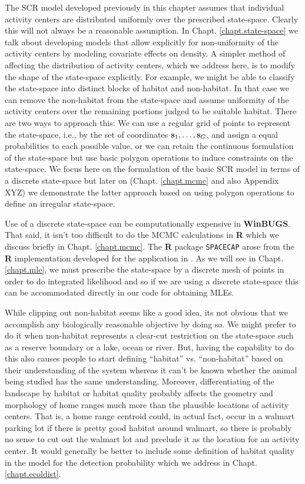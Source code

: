 {The SCR model developed previously in this chapter assumes that
individual activity centers are distributed uniformly over the
prescribed state-space. Clearly this will not always be a reasonable
assumption. In Chapt. \ref{chapt.state-space} we talk about developing models
that allow explicitly for non-uniformity of the activity centers by
modeling covariate effects on density. A simpler method of affecting
the distribution of activity centers, which we address here, is to
modify the shape of the state-space explicitly. For example, we might
be able to classify the state-space into distinct blocks of habitat
and non-habitat. In that case we can remove the non-habitat from the
state-space and assume uniformity of the activity centers over the
remaining portions judged to be suitable habitat.  There are two ways
to approach this: We can use a regular grid of points to represent the
state-space, i.e., by the set of coordinates ${\bf s}_1, \ldots, {\bf
  s}_{G}$, and assign a equal probabilities to each possible value, or
we can retain the continuous formulation of the state-space but use
basic polygon operations to induce constraints on the state-space. We
focus here on the formulation of the basic SCR model in terms of a
discrete state-space but later on (Chapt. \ref{chapt.mcmc} and also
Appendix XYZ) we demonstrate the latter approach based on using
polygon operations to define an irregular state-space.

Use of a discrete state-space can be computationally expensive in {\bf
  WinBUGS}. That said, it isn't too difficult to do the MCMC
calculations in {\bf R} which we discuss briefly in Chapt.
\ref{chapt.mcmc}. The {\bf R} package {\tt SPACECAP}
\citep{gopalaswamy_etal:2011} arose from the {\bf R} implementation
developed for the application in \citet{royle_etal:2009}.  As we will
see in Chapt. \ref{chapt.mle}, we must prescribe the state-space by a
discrete mesh of points in order to do integrated likelihood and so if
we are using a discrete state-space this can be accommodated directly
in our code for obtaining MLEs.

While clipping out non-habitat seems like a good idea, its not obvious
that we accomplish any biologically reasonable objective by doing
so. We might prefer to do it when non-habitat represents a clear-cut
restriction on the state-space such as a reserve boundary or a lake,
ocean or river. But, 
having the capability to do this also causes people to start defining
``habitat'' vs. ``non-habitat'' based on their understanding of the
system whereas it can't be known whether the animal being studied has
the same understanding. Moreover, differentiating of the landscape by
habitat or habitat quality probably affects the geometry and
morphology of home ranges much more than the plausible locations of
activity centers. That is, a home range centroid could, in actual
fact, occur in a walmart parking lot if there is pretty good habitat
around walmart, so there is probably no sense to cut out the walmart
lot and preclude it as the location for an activity center.  It would
generally be better to include some definition of habitat quality in
the model for the detection probability \citep{royle_etal:2012ecol}
which we address in Chapt. \ref{chapt.ecoldist}.


}
